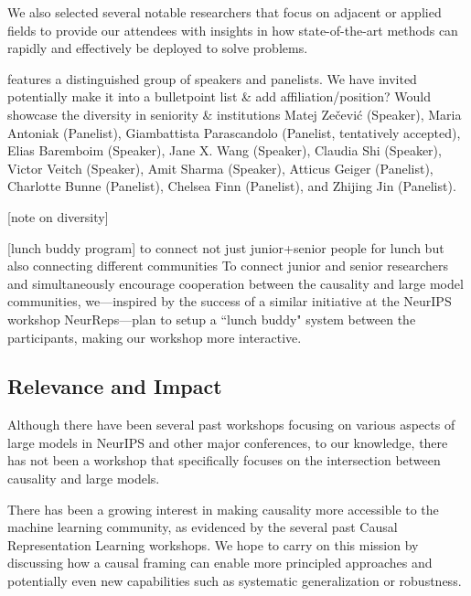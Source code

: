 \documentclass{article}
\begin{document}
We also selected several notable researchers that focus on adjacent or applied fields to provide our attendees with insights in how state-of-the-art methods can rapidly and effectively be deployed to solve problems.

features a distinguished group of speakers and panelists. We have invited {\color{blue} potentially make it into a bulletpoint list \& add affiliation/position? Would showcase the diversity in seniority \& institutions}  Matej Zečević (Speaker), Maria Antoniak (Panelist), Giambattista Parascandolo (Panelist, tentatively accepted), Elias Baremboim (Speaker), Jane X. Wang (Speaker), Claudia Shi (Speaker), Victor Veitch (Speaker), Amit Sharma (Speaker), Atticus Geiger (Panelist), Charlotte Bunne (Panelist), Chelsea Finn (Panelist), and Zhijing Jin (Panelist).

[note on diversity]




[lunch buddy program] to connect not just junior+senior people for lunch but also connecting different communities
    To connect junior and senior researchers and simultaneously encourage cooperation between the causality and large model communities, we---inspired by the success of a similar initiative at the NeurIPS workshop NeurReps---plan to setup a ``lunch buddy" system between the participants, making our workshop more interactive.


\subsection{Relevance and Impact}

Although there have been several past workshops focusing on various aspects of large models in NeurIPS and other major conferences, to our knowledge, there has not been a workshop that specifically focuses on the intersection between causality and large models.

There has been a growing interest in making causality more accessible to the machine learning community, as evidenced by the several past Causal Representation Learning workshops. We hope to carry on this mission by discussing how a causal framing can enable more principled approaches and potentially even new capabilities such as systematic generalization or robustness.
\end{document}
